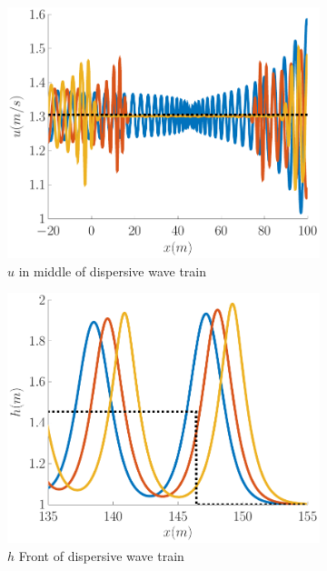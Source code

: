 \documentclass[10pt]{article}
\begin{document}
\begin{figure}
\begin{subfigure}{0.32\textwidth}
	\centering
	\includegraphics[width=\textwidth]{./Figures/Simulations/Study/ImpDisp/uMiddle.pdf}
	\caption{$u$ in middle of dispersive wave train}
	\end{subfigure}
	\begin{subfigure}{0.32\textwidth}
	\centering
	\includegraphics[width=\textwidth]{./Figures/Simulations/Study/ImpDisp/hFront.pdf}
	\caption{$h$ Front of dispersive wave train}
	\end{subfigure}
	\begin{subfigure}{0.32\textwidth}
	\centering

\end{subfigure}
\end{figure}
\end{document}
